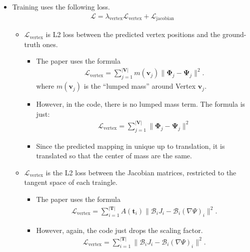 \documentclass[10pt]{article}
\newcommand{\ve}[1]{\mathbf{#1}}
\newcommand{\ves}[1]{\boldsymbol{#1}}
\newcommand{\mrm}[1]{\mathrm{#1}}
\newcommand{\mcal}[1]{\mathcal{#1}}
\begin{document}
\begin{itemize}
    \item Training uses the following loss.
    \begin{align*}
        \mcal{L} = \lambda_{\mrm{vertex}} \mcal{L}_{\mrm{vertex}} + \mcal{L}_{\mrm{jacobian}}
    \end{align*}
    \begin{itemize}
        \item $\mcal{L}_{\mrm{vertex}}$ is L2 loss between the predicted vertex positions and the ground-truth ones.
        \begin{itemize}
            \item The paper uses the formula
            \begin{align*}
                \mcal{L}_{\mrm{vertex}} = \sum_{j=1}^{|\ve{V}|} m(\ve{v}_j) \| \ves{\Phi}_j - \ves{\Psi}_j \|^2.
            \end{align*}
            where $m(\ve{v}_j)$ is the ``lumped mass'' around Vertex $\ve{v}_j$.
            \item However, in the code, there is no lumped mass term. The formula is just:
            \begin{align*}
                \mcal{L}_{\mrm{vertex}} = \sum_{j=1}^{|\ve{V}|} \| \ves{\Phi}_j - \ves{\Psi}_j \|^2
            \end{align*}
            \item Since the predicted mapping in unique up to translation, it is translated so that the center of mass are the same.
        \end{itemize}

        \item $\mcal{L}_{\mrm{vertex}}$ is the L2 loss between the Jacobian matrices, restricted to the tangent space of each traingle.
        \begin{itemize}
            \item The paper uses the formula
            \begin{align*}
                \mcal{L}_{\mrm{vertex}} = \sum_{i=1}^{|\ve{T}|} A(\ve{t}_i) \| \mcal{B}_i J_i - \mcal{B}_i (\nabla \Psi)_i \|^2.
            \end{align*}
            \item However, again, the code just drops the scaling factor.
            \begin{align*}
                \mcal{L}_{\mrm{vertex}} = \sum_{i=1}^{|\ve{T}|} \| \mcal{B}_i J_i - \mcal{B}_i (\nabla \Psi)_i \|^2.
            \end{align*}
        \end{itemize}


\end{itemize}
\end{itemize}
\end{document}
